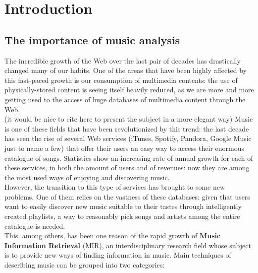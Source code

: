 
\chapter{Introduction} %

\label{Chapter1} %



\section{The importance of music analysis}
The incredible growth of the Web over the last pair of decades has drastically changed many of our habits. One of the areas that have been highly affected by this fast-paced growth is our consumption of multimedia contents: the use of physically-stored content is seeing itself heavily reduced, as we are more and more getting used to the access of huge databases of multimedia content through the Web.\\ (it would be nice to cite \cite{orio06} here to present the subject in a more elegant way)
Music is one of these fields that have been revolutionized by this trend: the last decade has seen the rise of several Web services (iTunes, Spotify, Pandora, Google Music just to name a few) that offer their users an easy way to access their enormous catalogue of songs. Statistics show an increasing rate of annual growth for each of these services, in both the amount of users and of revenues: now they are among the most used ways of enjoying and discovering music. \\
However, the transition to this type of services has brought to some new problems. One of them relies on the vastness of these databases: given that users want to easily discover new music suitable to their tastes through intelligently created playlists, a way to reasonably pick songs and artists among the entire catalogue is needed. \\
This, among others, has been one reason of the rapid growth of \textbf{Music Information Retrieval} (MIR), an interdisciplinary research field whose subject is to provide new ways of finding information in music. Main techniques of describing music can be grouped into two categories: 
